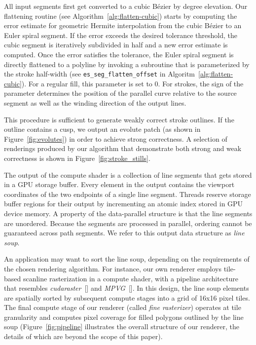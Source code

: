 \documentclass[sigconf, nonacm]{acmart}
\begin{document}
All input segments first get converted to a cubic Bézier by degree elevation. Our flattening routine (see Algorithm~\ref{alg:flatten-cubic}) starts by computing the error estimate for geometric Hermite interpolation from the cubic Bézier to an Euler spiral segment. If the error exceeds the desired tolerance threshold, the cubic segment is iteratively subdivided in half and a new error estimate is computed. Once the error satisfies the tolerance, the Euler spiral segment is directly flattened to a polyline by invoking a subroutine that is parameterized by the stroke half-width (see \texttt{es\_seg\_flatten\_offset} in Algoritm~\ref{alg:flatten-cubic}). For a regular fill, this parameter is set to $0$. For strokes, the sign of the parameter determines the position of the parallel curve relative to the source segment as well as the winding direction of the output lines.

This procedure is sufficient to generate weakly correct stroke outlines. If the outline contains a cusp, we output an evolute patch (as shown in Figure~\ref{fig:evolutes}) in order to achieve strong correctness. A selection of renderings produced by our algorithm that demonstrate both strong and weak correctness is shown in Figure~\ref{fig:stroke_stills}.

The output of the compute shader is a collection of line segments that gets stored in a GPU storage buffer. Every element in the output contains the viewport coordinates of the two endpoints of a single line segment. Threads reserve storage buffer regions for their output by incrementing an atomic index stored in GPU device memory. A property of the data-parallel structure is that the line segments are unordered. Because the segments are processed in parallel, ordering cannot be guaranteed across path segments. We refer to this output data structure as \emph{line soup}.

An application may want to sort the line soup, depending on the requirements of the chosen rendering algorithm. For instance, our own renderer employs tile-based scanline rasterization in a compute shader, with a pipeline architecture that resembles \emph{cudaraster}~[] and \emph{MPVG}~[]. In this design, the line soup elements are spatially sorted by subsequent compute stages into a grid of 16x16 pixel tiles. The final compute stage of our renderer (called \emph{fine rasterizer}) operates at tile granularity and computes pixel coverage for filled polygons outlined by the line soup (Figure~\ref{fig:pipeline} illustrates the overall structure of our renderer, the details of which are beyond the scope of this paper).
\end{document}
